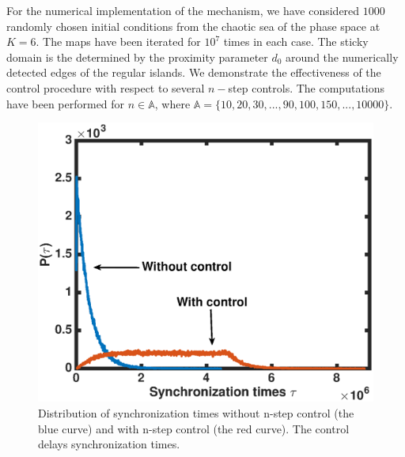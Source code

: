 \documentclass[reprint,superscriptaddress,amsmath,amssymb,aps,pre]{revtex4-1}
\begin{document}
For the numerical implementation of the mechanism, we have considered $1000$ randomly chosen initial conditions from the chaotic sea of the phase space at $K = 6$. The maps have been iterated for $10^7$ times in each case.  The sticky domain is the determined by the proximity parameter $d_0$ around the numerically detected edges of the regular islands. We demonstrate the effectiveness of the control procedure  with respect to several $n-$step controls. The computations have been performed for $n \in \mathbb{A}$, where $\mathbb{A} = \{10, 20,30,...,90, 100, 150, ... ,10 000\}$.  

\begin{figure}[t]
	\includegraphics[scale=0.45]{Sync_time_dist.eps}
	\caption{\label{fig:Sync_time_dist}\footnotesize Distribution of 
		synchronization times without n-step control (the blue curve) and with 
		n-step 
		control (the red curve). The control delays synchronization times. }
\end{figure}
\end{document}
